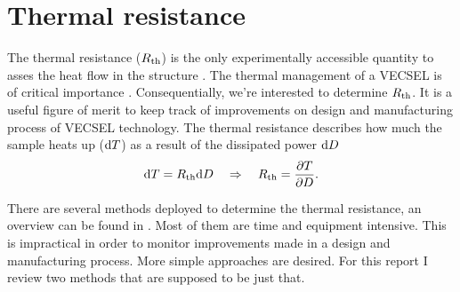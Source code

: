 \section{Thermal resistance}
\label{sec:rth}

The thermal resistance ($R_\mathrm{th}$) is
the only experimentally accessible quantity
to asses the heat flow
in the structure \cite{Heinen2012}.
The thermal management
of a VECSEL is of critical importance
\cite{Tropper2006,Kemp2008,Vetter2012,Giet2008}.
Consequentially,
we're interested to determine $R_\mathrm{th}$.
It is a useful
figure of merit
to keep track of improvements
on design and manufacturing process
of VECSEL technology.
The thermal resistance
describes how much the sample heats up ($\mathrm{d} T$)
as a result of the dissipated power $\mathrm{d} D$
\begin{equation}
\mathrm{d} T = R_\mathrm{th} \mathrm{d} D \quad \Rightarrow \quad R_\mathrm{th} = \frac{\partial T}{\partial D}.
\label{eq:rth}
\end{equation}

There are several methods deployed
to determine
the thermal resistance,
an overview can be found in \cite{Heinen2012}.
Most of them are time and equipment intensive.
This is impractical
in order to monitor
improvements made in a design and
manufacturing process.
More simple approaches are desired.
For this report
I review two methods
that are supposed to be
just that.







